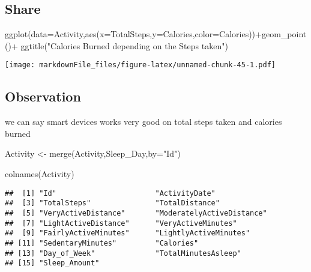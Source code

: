 \documentclass[
]{article}
\newenvironment{Shaded}{\begin{snugshade}}{\end{snugshade}}
\newcommand{\AttributeTok}[1]{\textcolor[rgb]{0.77,0.63,0.00}{#1}}
\newcommand{\FunctionTok}[1]{\textcolor[rgb]{0.00,0.00,0.00}{#1}}
\newcommand{\NormalTok}[1]{#1}
\newcommand{\OtherTok}[1]{\textcolor[rgb]{0.56,0.35,0.01}{#1}}
\newcommand{\SpecialCharTok}[1]{\textcolor[rgb]{0.00,0.00,0.00}{#1}}
\newcommand{\StringTok}[1]{\textcolor[rgb]{0.31,0.60,0.02}{#1}}
\begin{document}
\hypertarget{share}{%
\subsection{Share}\label{share}}

\begin{Shaded}
\begin{Highlighting}[]
\FunctionTok{ggplot}\NormalTok{(}\AttributeTok{data=}\NormalTok{Activity,}\FunctionTok{aes}\NormalTok{(}\AttributeTok{x=}\NormalTok{TotalSteps,}\AttributeTok{y=}\NormalTok{Calories,}\AttributeTok{color=}\NormalTok{Calories))}\SpecialCharTok{+}\FunctionTok{geom\_point}\NormalTok{()}\SpecialCharTok{+} \FunctionTok{ggtitle}\NormalTok{(}\StringTok{"Calories Burned depending on the Steps taken"}\NormalTok{)}
\end{Highlighting}
\end{Shaded}

\texttt{[image: markdownFile\_files/figure-latex/unnamed-chunk-45-1.pdf]}

\hypertarget{observation}{%
\subsection{Observation}\label{observation}}

we can say smart devices works very good on total steps taken and
calories burned

\begin{Shaded}
\begin{Highlighting}[]
\NormalTok{Activity }\OtherTok{\textless{}{-}} \FunctionTok{merge}\NormalTok{(Activity,Sleep\_Day,}\AttributeTok{by=}\StringTok{"Id"}\NormalTok{)}
\end{Highlighting}
\end{Shaded}

\begin{Shaded}
\begin{Highlighting}[]
\FunctionTok{colnames}\NormalTok{(Activity)}
\end{Highlighting}
\end{Shaded}

\begin{verbatim}
##  [1] "Id"                       "ActivityDate"            
##  [3] "TotalSteps"               "TotalDistance"           
##  [5] "VeryActiveDistance"       "ModeratelyActiveDistance"
##  [7] "LightActiveDistance"      "VeryActiveMinutes"       
##  [9] "FairlyActiveMinutes"      "LightlyActiveMinutes"    
## [11] "SedentaryMinutes"         "Calories"                
## [13] "Day_of_Week"              "TotalMinutesAsleep"      
## [15] "Sleep_Amount"
\end{verbatim}
\end{document}
